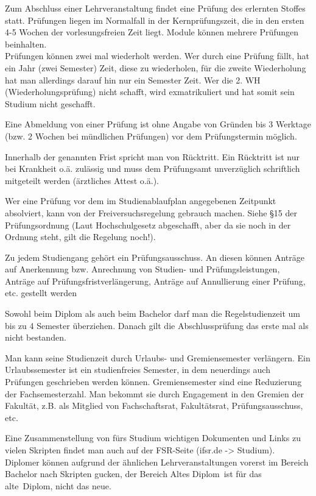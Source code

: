 \documentclass[a4paper,12pt]{report}
\begin{document}
\begin{itemize*}
\item Zum Abschluss einer Lehrveranstaltung findet eine Prüfung des erlernten Stoffes statt. Prüfungen liegen im Normalfall in der Kernprüfungszeit, die in den ersten 4-5 Wochen der vorlesungsfreien Zeit liegt. Module können mehrere Prüfungen beinhalten.\\
Prüfungen können zwei mal wiederholt werden. Wer durch eine Prüfung fällt, hat ein Jahr (zwei Semester) Zeit, diese zu wiederholen, für die zweite Wiederholung hat man allerdings darauf hin nur ein Semester Zeit. Wer die 2. WH (Wiederholungsprüfung) nicht schafft, wird exmatrikuliert und hat somit sein Studium nicht geschafft.
\item Eine Abmeldung von einer Prüfung ist ohne Angabe von Gründen bis 3 Werktage (bzw. 2 Wochen bei mündlichen Prüfungen) vor dem Prüfungstermin möglich.
\item Innerhalb der genannten Frist spricht man von Rücktritt. Ein Rücktritt ist nur bei Krankheit o.ä. zulässig und muss dem Prüfungsamt unverzüglich schriftlich mitgeteilt werden (ärztliches Attest o.ä.).
\item Wer eine Prüfung vor dem im Studienablaufplan angegebenen Zeitpunkt absolviert, kann von der Freiversuchsregelung gebrauch machen. Siehe \S15 der Prüfungsordnung (Laut Hochschulgesetz abgeschafft, aber da sie noch in der Ordnung steht, gilt die Regelung noch!).
\item Zu jedem Studiengang gehört ein Prüfungsausschuss. An diesen können Anträge auf Anerkennung bzw. Anrechnung von Studien- und Prüfungsleistungen, Anträge auf Prüfungsfristverlängerung, Anträge auf Annullierung einer Prüfung, etc. gestellt werden
\item Sowohl beim Diplom als auch beim Bachelor darf man die Regelstudienzeit um bis zu 4 Semester überziehen. Danach gilt die Abschlussprüfung das erste mal als nicht bestanden.
\item Man kann seine Studienzeit durch Urlaubs- und Gremiensemester verlängern. Ein Urlaubssemester ist ein studienfreies Semester, in dem neuerdings auch Prüfungen geschrieben werden können. Gremiensemester sind eine Reduzierung der Fachsemesterzahl. Man bekommt sie durch Engagement in den Gremien der Fakultät, z.B. als Mitglied von Fachschaftsrat, Fakultätsrat, Prüfungsausschuss, etc.
\item Eine Zusammenstellung von fürs Studium wichtigen Dokumenten und Links zu vielen Skripten findet man auch auf der FSR-Seite (ifsr.de -> Studium). Diplomer können aufgrund der ähnlichen Lehrveranstaltungen vorerst im Bereich Bachelor nach Skripten gucken, der Bereich \glqq Altes Diplom\grqq\ ist für das \glqq alte\grqq\ Diplom, nicht das neue.

\end{itemize*}
\end{document}
